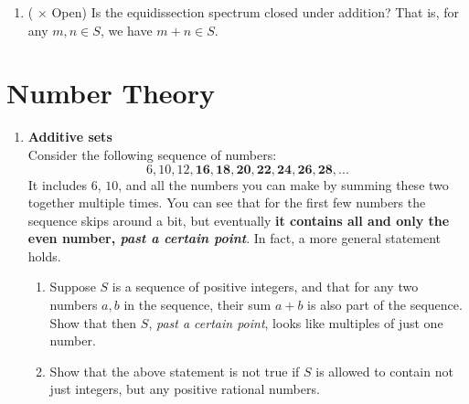 \documentclass[11pt]{scrartcl}
\begin{document}
\begin{enumerate}[label=\textbf{G\arabic*}.]
\begin{enumerate}
        \item (\fullchili \hspace{1pt} $\times$ Open) Is the equidissection spectrum closed under addition? That is, for any $m, n \in S$, we have $m + n \in S$. 
    \end{enumerate}
    
    
\end{enumerate}

\newpage
\section{Number Theory}
\begin{enumerate}[label=\textbf{N\arabic*}.]
    \item \textbf{Additive sets}\\
    Consider the following sequence of numbers:
    \[ 6, 10, 12, \mathbf{16, 18, 20, 22, 24, 26, 28, ...} \]
    It includes $6$, $10$, and all the numbers you can make by summing these two together multiple times. You can see that for the first few numbers the sequence skips around a bit, but eventually \textbf{it contains all and only the even number, \emph{past a certain point}}. In fact, a more general statement holds.
    
    \begin{enumerate}
        \item Suppose $S$ is a sequence of positive integers, and that for any two numbers $a, b$ in the sequence, their sum $a+b$ is also part of the sequence. Show that then $S$, \emph{past a certain point}, looks like multiples of just one number.
        
        \item Show that the above statement is not true if $S$ is allowed to contain not just integers, but any positive rational numbers.
    \end{enumerate}
\end{enumerate}
\end{document}
